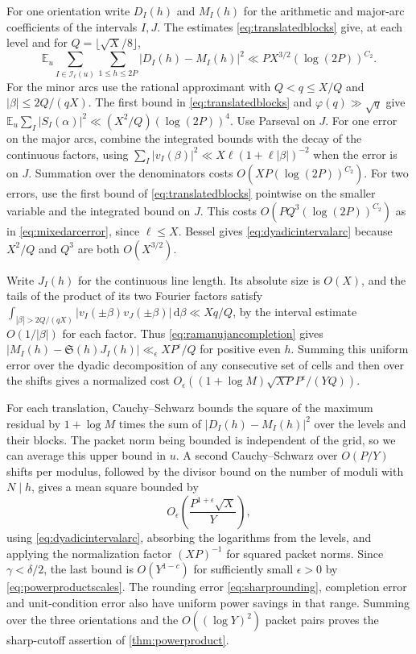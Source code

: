 \documentclass[11pt,a4paper]{article}
\numberwithin{equation}{section}
\newcommand{\SSS}{\mathfrak S}
\newcommand{\ud}{\mathrm d}
\begin{document}
For one orientation write $D_I(h)$ and $M_I(h)$ for the
arithmetic and major-arc coefficients of the intervals
$I,J$. The estimates \eqref{eq:translatedblocks} give,
at each level and for $Q=\lfloor\sqrt X/8\rfloor$,
\begin{equation}
 \mathbb E_u \sum_{I\in\mathcal I_\ell(u)}\sum_{1\le h\le2P}
       |D_I(h)-M_I(h)|^2
      \ll P X^{3/2}(\log(2P))^{C_2}.
 \label{eq:dyadicintervalarc}
\end{equation}
For the minor arcs use the rational approximant with
$Q<q\le X/Q$ and $|\beta|\le 2Q/(qX)$. The first bound
in \eqref{eq:translatedblocks} and $\varphi(q)\gg\sqrt q$
give $\mathbb E_u\sum_I |S_I(\alpha)|^2\ll
(X^2/Q)(\log(2P))^4$. Use Parseval on $J$.
For one error on the major arcs, combine the integrated
bounds with the decay of the continuous factors, using
$\sum_I |v_I(\beta)|^2\ll X\ell(1+\ell|\beta|)^{-2}$
when the error is on $J$. Summation over the denominators
costs $O(XP(\log(2P))^{C_2})$. For two errors, use the
first bound of \eqref{eq:translatedblocks} pointwise on
the smaller variable and the integrated bound on $J$.
This costs $O(PQ^3(\log(2P))^{C_2})$ as in
\cref{eq:mixedarcerror}, since $\ell\le X$.
Bessel gives \eqref{eq:dyadicintervalarc} because
$X^2/Q$ and $Q^3$ are both $O(X^{3/2})$.

Write $J_I(h)$ for the continuous line length. Its
absolute size is $O(X)$, and the tails of the product
of its two Fourier factors satisfy
$\int_{|\beta|>2Q/(qX)}|v_I(\pm\beta)v_J(\pm\beta)|\,\ud\beta
\ll Xq/Q$, by the interval estimate $O(1/|\beta|)$ for
each factor. Thus \cref{eq:ramanujancompletion} gives
$|M_I(h)-\SSS(h)J_I(h)|\ll_\epsilon XP^\epsilon/Q$
for positive even $h$. Summing this uniform error over
the dyadic decomposition of any consecutive set of cells
and then over the shifts gives a normalized cost
$O_\epsilon((1+\log M)\sqrt{XP}P^\epsilon/(YQ))$.

For each translation, Cauchy--Schwarz bounds the square of
the maximum residual by $1+\log M$ times the sum of
$|D_I(h)-M_I(h)|^2$ over the levels and their blocks.
The packet norm being bounded is independent of the grid,
so we can average this upper bound in $u$. A second
Cauchy--Schwarz over $O(P/Y)$ shifts per modulus, followed
by the divisor bound on the number of moduli with $N\mid h$,
gives a mean square bounded by
\[
 O_\epsilon\left(\frac{P^{1+\epsilon}\sqrt X}{Y}\right),
\]
using \cref{eq:dyadicintervalarc}, absorbing the logarithms
from the levels, and applying the normalization factor
$(XP)^{-1}$ for squared packet norms. Since $\gamma<\delta/2$,
the last bound is $O(Y^{1-c})$ for sufficiently small
$\epsilon>0$ by \cref{eq:powerproductscales}. The rounding error
\eqref{eq:sharprounding}, completion error and unit-condition
error also have uniform power savings in that range.
Summing over the three orientations and the
$O((\log Y)^2)$ packet pairs proves the sharp-cutoff
assertion of \cref{thm:powerproduct}.
\end{document}
